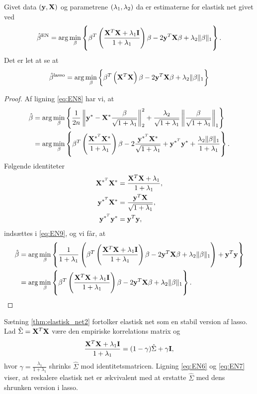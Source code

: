 \begin{thm} \label{thm:elastisk_net2}
Givet data \(\del{\y, \X}\) og parametrene \(\del{\lambda_1, \lambda_2}\) da er estimaterne for elastisk net givet ved
\begin{align}
\hat{\beta}^\text{EN} = \arg \min_\beta \cbr{ \beta^T \del{\frac{\X^T \X + \lambda_1 \mathbf{I}}{1 + \lambda_1}} \beta - 2 \y^T \X \beta + \lambda_2 \Vert \beta \Vert_1}. \label{eq:EN6}
\end{align}
Det er let at se at
\begin{align}
\hat{\beta}^\text{lasso} = \arg \min_\beta \cbr{ \beta^T \del{\X^T \X} \beta - 2 \y^T \X \beta + \lambda_2 \Vert \beta \Vert_1} \label{eq:EN7}
\end{align}
\end{thm}
\begin{proof}
Af ligning \eqref{eq:EN8} har vi, at
\begin{align}
\hat{\beta} &= \arg \min_{\beta} \cbr{\frac{1}{2n} \left\Vert \y^* - \X^* \frac{\beta}{\sqrt{1+\lambda_1}} \right\Vert_2^2 + \frac{\lambda_2}{\sqrt{1+\lambda_1}} \left\Vert \frac{\beta}{\sqrt{1+\lambda_1}} \right\Vert_1} \nonumber \\
&=\arg \min_{\beta} \cbr{\beta^T \del{\frac{\X^{*^T} \X^*}{1+\lambda_1}} \beta - 2 \frac{\y^{*^T} \X^*}{\sqrt{1+\lambda_1}} + \y^{*^T} \y^* + \frac{\lambda_2 \Vert \beta \Vert_1}{1+\lambda_1}}. \label{eq:EN9}
\end{align}
Følgende identiteter
\begin{align*}
\mathbf{X}^{*^T} \mathbf{X}^* &= \frac{\mathbf{X}^T \mathbf{X} + \lambda_1}{1+ \lambda_1}, \\
\mathbf{y}^{*^T} \mathbf{X}^* &= \frac{\mathbf{y}^T \mathbf{X}}{\sqrt{1+\lambda_1}} ,\\
\mathbf{y}^{*^T} \mathbf{y}^* &= \mathbf{y}^T \mathbf{y}, 
\end{align*}
indsættes i \eqref{eq:EN9}, og vi får, at
\begin{align*}
\hat{\beta} &= \arg \min_{\beta} \cbr{\frac{1}{1+\lambda_1} \del{\beta^T \del{\frac{\X^T \X + \lambda_1\mathbf{I}}{1+ \lambda_1}} \beta - 2 \y^T \X \beta + \lambda_2 \Vert \beta \Vert_1} + \y^T \y} \\
&= \arg \min_{\beta} \cbr{\beta^T \del{\frac{\X^T \X + \lambda_1\mathbf{I}}{1+ \lambda_1}} \beta - 2 \y^T \X \beta + \lambda_2 \Vert \beta \Vert_1}.
\end{align*}
\end{proof}
%
Sætning \ref{thm:elastisk_net2} fortolker elastisk net som en stabil version af lasso.
Lad \(\hat{\Sigma} = \mathbf{X}^T \mathbf{X}\) være den empiriske korrelations matrix og
\begin{align*}
\frac{\mathbf{X}^T \mathbf{X} + \lambda_1 \mathbf{I}}{1 + \lambda_1} = (1-\gamma) \hat{\Sigma} + \gamma \mathbf{I},
\end{align*}
hvor \(\gamma=\frac{\lambda_1}{1+\lambda_1}\) shrinks \(\hat{\Sigma}\) mod identitetsmatricen.
Ligning \eqref{eq:EN6} og \eqref{eq:EN7} viser, at reskalere elastisk net er ækvivalent med at erstatte \(\hat{\Sigma}\) med dens shrunken version i lasso.


